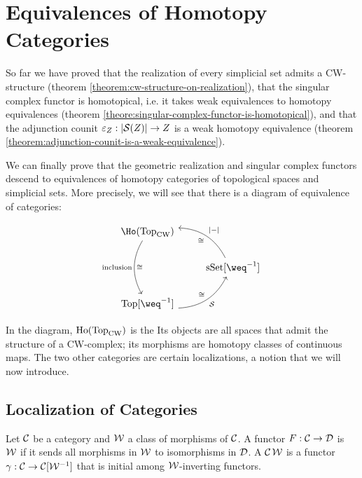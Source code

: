 
\section{Equivalences of Homotopy Categories}


So far we have proved that the realization of every simplicial set admits a CW-structure (theorem \ref{theorem:cw-structure-on-realization}), that the singular complex functor is homotopical, i.e. it takes weak equivalences to homotopy equivalences (theorem \ref{theore:singular-complex-functor-is-homotopical}), and that the adjunction counit $\epsilon_Z:|\S(Z)|\to Z$ is a weak homotopy equivalence (theorem \ref{theorem:adjunction-counit-is-a-weak-equivalence}).

We can finally prove that the geometric realization and singular complex functors descend to equivalences of homotopy categories of topological spaces and simplicial sets. More precisely, we will see that there is a diagram of equivalence of categories:

\[
\begin{tikzcd}
    \Ho(\Top_\text{CW}) \ar[dd,bend right,"\text{inclusion}"',"\cong"] & \\
     & \sSet[\weq^\inv] \ar[ul,bend right,"|-|"',"\cong"]\\
     \Top[\weq^\inv] \ar[ur,bend right, "\S"',"\cong"] & 
\end{tikzcd}
\]

In the diagram, $\ho(\Top_\text{CW})$ is the  Its objects are all spaces that admit the structure of a CW-complex; its morphisms are homotopy classes of continuous maps. The two other categories are certain localizations, a notion that we will now introduce.

\subsection{Localization of Categories}

Let $\Cc$ be a category and $\Ww$ a class of morphisms of $\Cc$. A functor $F:\Cc\to\Dd$ is $\Ww$ if it sends all morphisms in $\Ww$ to isomorphisms in $\Dd$. A $\Cc$$\Ww$ is a functor $\gamma:\Cc\to\Cc[\Ww^\inv]$ that is initial among $\Ww$-inverting functors.

